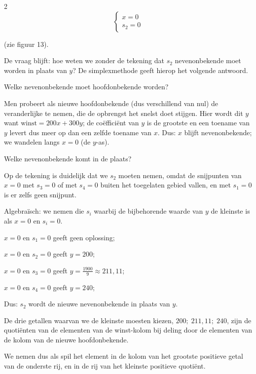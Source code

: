 \begin{multicols}{2}
	$$
	\left\{
	\begin{array}{c}
		
		x=0\\
		s_2=0
		
	\end{array}
	\right.
	$$
	
	(zie figuur 13).
	
	De vraag blijft: hoe weten we zonder de tekening dat $s_2$  nevenonbekende moet worden in plaats van $y$? De simplexmethode geeft hierop het volgende antwoord.
	
	\begin{opsomming}
		\item Welke nevenonbekende moet hoofdonbekende worden?
		
		Men probeert als nieuwe hoofdonbekende (dus verschillend van nul) de veranderlijke te nemen, die de opbrengst het snelst doet stijgen. Hier wordt dit $y$ want $\text{winst}=200x+300y$; de \mbox{coëfficiënt} van $y$ is de grootste en een toename van $y$ levert dus meer op dan een zelfde toename van $x$. Dus: $x$ blijft nevenonbekende; we wandelen langs $x=0$ (de $y$-as).
		
		\item Welke nevenonbekende komt in de plaats?
		
		Op de tekening is duidelijk dat we $s_2$ moeten nemen, omdat de snijpunten van $x=0$ met $s_3=0$ of met $s_4=0$ buiten het toegelaten gebied vallen, en met $s_1=0$ is er zelfs geen snijpunt.
		
		Algebraïsch: we nemen die $s_i$ waarbij de bijbehorende waarde van $y$ de kleinste is als $x=0$ en $s_i=0$.
		
		$x=0$ en $s_1=0$ geeft geen oplossing;
		
		$x=0$ en $s_2=0$ geeft $y=200$;
		
		$x=0$ en $s_3=0$ geeft $y=\frac{1900}{9}\approx 211,11$;
		
		$x=0$ en $s_4=0$ geeft $y=240$;
		
		Dus: $s_2$ wordt de nieuwe nevenonbekende in plaats van $y$.
		
	\end{opsomming}
	
	De drie getallen waarvan we de kleinste moesten kiezen, $200;\; 211,11; \;240$, zijn de quotiënten van de elementen van de winst-kolom bij deling door de elementen van de kolom van de nieuwe hoofdonbekende.
	
	We nemen dus als spil het element in de kolom van het grootste positieve getal van de onderste rij, en in de rij van het kleinste positieve quotiënt.
	

\end{multicols}
